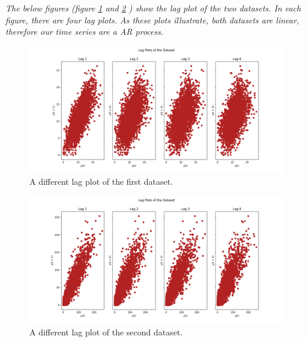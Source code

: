 \documentclass[12pt]{article}
\begin{document}
\begin{enumerate}
\textit{The below figures (figure \ref{fig:Ass1_D1_Lag_Plots} and \ref{fig:Ass1_D2_Lag_Plots} ) show the lag plot of the two datasets. In each figure, there are four lag plots. As these plots illustrate, both datasets are linear, therefore our time series are a AR process.  }


\begin{figure}[H]
    \centering
    \begin{minipage}[b]{1\textwidth}
        \includegraphics[width=\textwidth]{figures/Ass1/Ass1_D1_Lag_Plots.png}
    \end{minipage}
    \caption{A different lag plot of the first dataset.}
    \label{fig:Ass1_D1_Lag_Plots}
\end{figure}

\begin{figure}[H]
    \centering
    \begin{minipage}[b]{1\textwidth}
        \includegraphics[width=\textwidth]{figures/Ass1/Ass1_D2_Lag_Plots.png}
    \end{minipage}
    \caption{A different lag plot of the second dataset.}
    \label{fig:Ass1_D2_Lag_Plots}
\end{figure}





\end{enumerate}
\end{document}
